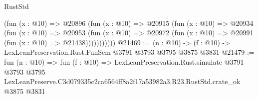 \begin{lexlean}{RustStd}
\begin{coremodule}
            (fun (x : @10) =>
            @20896
              (fun (x : @10) =>
              @20915
                (fun (x : @10) =>
                @20934
                  (fun (x : @10) =>
                  @20953
                    (fun (x : @10) =>
                    @20972 (fun (x : @10) => @20991 (fun (x : @10) => @21438)))))))))))
@21469 := (n : @10) -> (f : @10) -> LexLeanPreservation.Rust.FunSem @3791 @3793 @3795 @3875 @3831
@21479 := fun (n : @10) =>
  fun (f : @10) =>
  LexLeanPreservation.Rust.simulate
    @3791
    @3793
    @3795
    LexLeanPreserve.C3d079335c2ca6564ff8a2f17a53982a3.R23.RustStd.crate_ok
    @3875
    @3831
\end{coremodule}
\end{lexlean}
